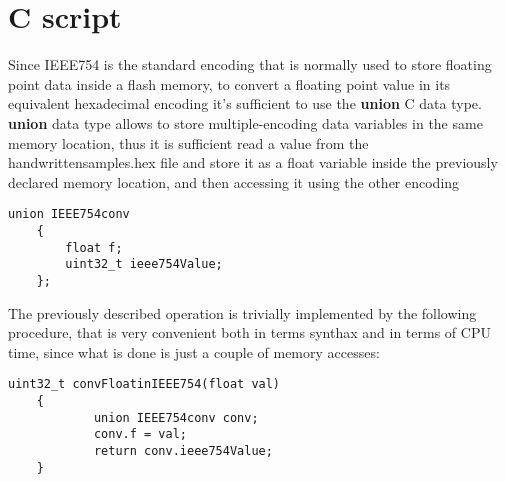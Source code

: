 \section{C script}
Since IEEE754 is the standard encoding that is normally used to store floating point data inside a flash memory, to convert a floating point value in its equivalent hexadecimal 
encoding it's sufficient to use the   \textbf{union}  C data type.
\textbf{union} data type allows to store multiple-encoding data variables in the same memory location, thus it is sufficient read a value from the handwrittensamples.hex file 
and store it as a float variable inside the previously declared memory location, and then accessing it using the other encoding
\begin{lstlisting}[style=CStyle]
    union IEEE754conv 
    {
        float f;
        uint32_t ieee754Value;
    };

\end{lstlisting}

The previously described operation is trivially implemented by the following procedure, that is very convenient both in terms synthax and in terms of CPU time, since what is done is just a couple of memory accesses:
\begin{lstlisting}[style=CStyle]
    uint32_t convFloatinIEEE754(float val)
    {
            union IEEE754conv conv;
            conv.f = val;
            return conv.ieee754Value;
    }
\end{lstlisting}
